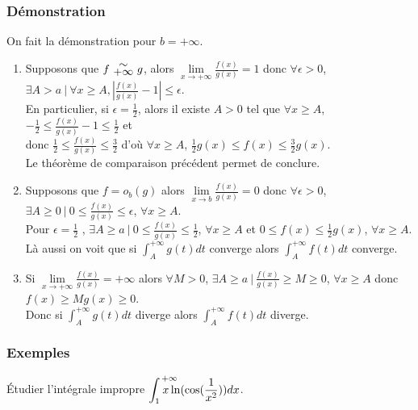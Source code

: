 \documentclass[a4paper,10pt]{book} %
\newcommand{\equi}[1]{\renewcommand{\arraystretch}{0.3}~\begin{matrix}\sim\\#1\end{matrix}~\renewcommand{\arraystretch}{1}}
\newcommand{\abs}[1]{\left|#1\right|}
\newcommand{\tq}{~|~}
\newcommand{\displayAmath}{\displaystyle}
\begin{document}
\subsubsection{Démonstration}
On fait la démonstration pour $b=+\infty$.
\begin{enumerate}
\item Supposons que $f\equi{+\infty} g$, alors $\lim\limits_{x\rightarrow+\infty}\frac{f(x)}{g(x)}=1$ donc $\forall \epsilon>0$, $\exists A>a\tq \forall x\geq A, \abs{\frac{f(x)}{g(x)}-1}\leq \epsilon$.\\

En particulier, si $\epsilon=\frac{1}{2}$, alors il existe $A>0$ tel que $\forall x\geq A$, $-\frac{1}{2}\leq \frac{f(x)}{g(x)}-1\leq \frac{1}{2}$ et\\
donc $\frac{1}{2}\leq \frac{f(x)}{g(x)}\leq \frac{3}{2}$ d'où $\forall x\geq A$, $\frac{1}{2}g(x)\leq f(x)\leq \frac{3}{2}g(x)$.\\

Le théorème de comparaison précédent permet de conclure.\\ \smallskip

\item Supposons que $f=o_b(g)$ alors $\lim\limits_{x\rightarrow b}\frac{f(x)}{g(x)}=0$
donc $\forall \epsilon>0$, $\exists A \geq 0 \tq 0\leq\frac{f(x)}{g(x)}\leq \epsilon$, $\forall x\geq A$.\\

Pour $\epsilon=\frac{1}{2}$ , $\exists A\geq a \tq 0\leq \frac{f(x)}{g(x)}\leq \frac{1}{2}$, $\forall x\geq A$
et $0\leq f(x)\leq \frac{1}{2}g(x)$, $\forall x\geq A$.\\

Là aussi on voit que si $\displayAmath \int_A^{+\infty}g(t)dt$ converge alors $\displayAmath \int_A^{+\infty}f(t)dt$ converge.\\ \smallskip

\item Si $\lim\limits_{x\rightarrow +\infty}\frac{f(x)}{g(x)}=+\infty$ alors $\forall M>0$, $\exists A\geq a \tq \frac{f(x)}{g(x)}\geq M\geq 0$, $\forall x\geq A$ donc $f(x)\geq Mg(x)\geq 0$.\\

Donc si $\displayAmath \int_A^{+\infty}g(t)dt$ diverge alors $\displayAmath \int_A^{+\infty} f(t)dt$ diverge.
\end{enumerate}

\subsubsection{Exemples}
Étudier l'intégrale impropre $\displayAmath\int_{1}^{\mathclap{~~~~~+\infty}}x \ln(\cos(\frac{1}{x^2}))dx$.\\
\end{document}
